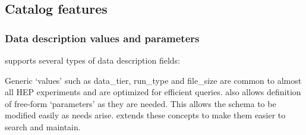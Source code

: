 \documentclass[../main-v1.tex]{subfiles}
\begin{document}


\subsection{Catalog features}

\subsubsection{Data description values and parameters}

  supports several types of data description fields:



  Generic `values' such as data\_tier, run\_type and file\_size  are common to almost all  HEP experiments and are optimized for efficient queries.   also allows definition of free-form `parameters' as they are needed.  This allows the schema to be modified easily as needs arise.   extends these concepts to make them easier to search and maintain. 





\end{document}
